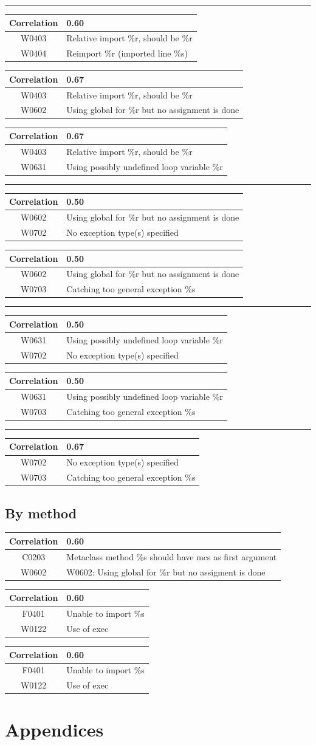 \documentclass[12pt, a4paper]{article}
\newcommand{\tbf}[1]{\textbf{#1}}
\newcommand{\noi}{\noindent}
\newcommand{\Wzfzth}{Relative import \%r, should be \%r}
\newcommand{\Wzfzf}{Reimport \%r (imported line \%s)}
\newcommand{\Wzsztw}{Using global for \%r but no assignment is done}
\newcommand{\Wzstho}{Using possibly undefined loop variable \%r}
\newcommand{\Wzseztw}{No exception type(s) specified}
\newcommand{\Wzsezth}{Catching too general exception \%s}
\newcommand{\mytab}[5]{
	\begin{tabularx}{\textwidth}{|c|X|}
	\hline
	\tbf{Correlation}		& #1 \\
	\hline
	#2	& #3 \\
	\hline
	#4	& #5 \\
	\hline
	\end{tabularx}
}
\begin{document}
\hrule
\bigskip \noi
\mytab{0.60}{W0403}{\Wzfzth{}}{W0404}{\Wzfzf{}}

\bigskip \noi
\mytab{0.67}{W0403}{\Wzfzth{}}{W0602}{\Wzsztw{}}

\bigskip \noi
\mytab{0.67}{W0403}{\Wzfzth{}}{W0631}{\Wzstho{}}

\hrule
\bigskip \noi
\mytab{0.50}{W0602}{\Wzsztw{}}{W0702}{\Wzseztw{}}

\bigskip \noi
\mytab{0.50}{W0602}{\Wzsztw{}}{W0703}{\Wzsezth{}}

\hrule
\bigskip \noi
\mytab{0.50}{W0631}{\Wzstho{}}{W0702}{\Wzseztw{}}

\bigskip \noi
\mytab{0.50}{W0631}{\Wzstho{}}{W0703}{\Wzsezth{}}

\hrule
\bigskip \noi
\mytab{0.67}{W0702}{\Wzseztw{}}{W0703}{\Wzsezth{}}



\subsection{By method}

\bigskip \noi
\begin{tabularx}{\textwidth}{|c|X|}
\hline
\tbf{Correlation}   & 0.60 \\
\hline
C0203   &  Metaclass method \%s should have mcs as first argument \\
\hline
W0602   &  W0602: Using global for \%r but no assigment is done \\
\hline
\end{tabularx}


\bigskip \noi
\begin{tabularx}{\textwidth}{|c|X|}
\hline
\tbf{Correlation}   & 0.60 \\
\hline
F0401   &  Unable to import \%s \\
\hline
W0122   &  Use of exec \\
\hline
\end{tabularx}

\bigskip \noi
\begin{tabularx}{\textwidth}{|c|X|}
\hline
\tbf{Correlation}   & 0.60 \\
\hline
F0401   &  Unable to import \%s \\
\hline
W0122   &  Use of exec \\
\hline
\end{tabularx}


\newpage
\section*{Appendices}
\end{document}
